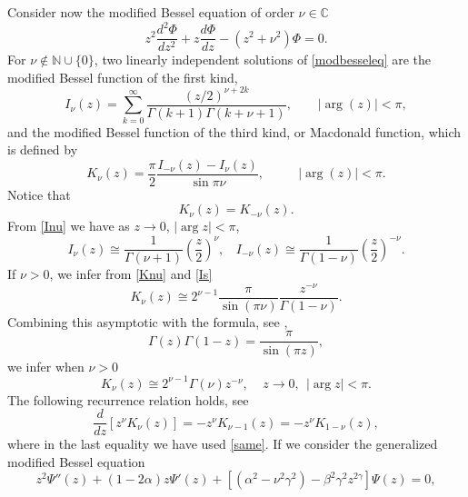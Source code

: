 \documentclass[11pt,letter]{amsart}
\def \G{\Gamma}
\numberwithin{equation}{section}
\numberwithin{equation}{section}
\begin{document}
Consider now the modified Bessel equation of order $\nu\in \mathbb C$
\begin{equation}\label{modbesseleq}
z^2 \frac{d^2\Phi}{dz^2} + z \frac{d\Phi}{dz} - (z^2 + \nu^2)\Phi = 0.
\end{equation}
For $\nu\not\in \mathbb N\cup\{0\}$, two linearly independent solutions of \eqref{modbesseleq} are the modified Bessel function of the first kind, 
\begin{equation}\label{Inu}
I_\nu(z) = \sum_{k=0}^\infty \frac{(z/2)^{\nu+2k}}{\G(k+1) \G(k+\nu+1)},\ \ \ \ \ \ \  \ \ |\arg(z)| < \pi,
\end{equation}
and the modified Bessel function of the third kind, or Macdonald function, which is defined by
\begin{equation}\label{Knu}
K_\nu(z) = \frac \pi{2} \frac{I_{-\nu}(z) - I_\nu(z)}{\sin \pi \nu},\ \ \ \ \ \ \ \ \ \ \  \ |\arg(z)| < \pi.
\end{equation}
Notice that 
\begin{equation}\label{same}
K_\nu(z) = K_{-\nu}(z).
\end{equation}
From \eqref{Inu} we have as $z\to 0$, $|\arg z|<\pi$,
\begin{equation}\label{Is}
I_{\nu}(z) \cong \frac 1{\G(\nu+1)} \left(\frac{z}{2}\right)^{\nu},\ \ \ \ I_{-\nu}(z) \cong \frac 1{\G(1-\nu)} \left(\frac{z}{2}\right)^{-\nu}.
\end{equation}
If $\nu> 0$, we infer from \eqref{Knu} and \eqref{Is}
\[
K_{\nu}(z) \cong 2^{\nu-1} \frac{\pi}{\sin(\pi \nu)} \frac{z^{-\nu}}{\G(1-\nu)}.
\]
Combining this asymptotic with the formula, see \cite[(1.2.2) p.3]{Le},  
\begin{equation}\label{sine}
\G(z) \G(1-z) = \frac{\pi}{\sin(\pi z)},
\end{equation} 
we infer when $\nu> 0$
\begin{equation}\label{zeroKnu}
K_{\nu}(z) \cong 2^{\nu-1} \G(\nu) z^{-\nu},\ \ \ \ \ z\to 0,\ \ |\arg z|<\pi.
\end{equation}
The following recurrence relation holds, see \cite[(5.7.9), p.110]{Le}
\begin{equation}\label{recuu}
\frac{d}{dz} [z^\nu K_\nu(z)] = - z^\nu K_{\nu-1}(z) = -  z^\nu K_{1-\nu}(z),
\end{equation}
where in the last equality we have used \eqref{same}.
If we consider the generalized modified Bessel equation
\begin{equation}\label{modgenbessel}
z^2 \Psi''(z) + (1 - 2\alpha) z \Psi'(z) + \left[(\alpha^2 - \nu^2 \gamma^2)- \beta^2 \gamma^2
z^{2\gamma}\right] \Psi(z) = 0,
\end{equation}
\end{document}
